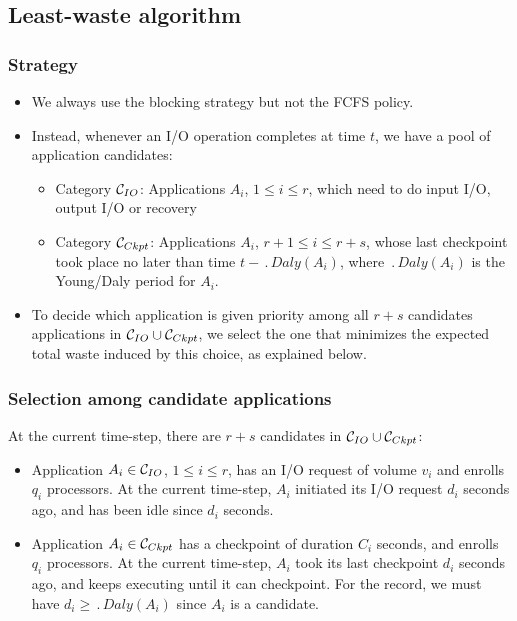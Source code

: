 \subsection{Least-waste algorithm}


\subsubsection{Strategy}

\begin{itemize}
  \item We always use the blocking strategy but not the FCFS policy.
  \item Instead, whenever an I/O operation completes at time $t$, we have a pool of application candidates:
  \begin{itemize}
   \item Category \IOcat $\mathcal{C}_{IO}$: Applications $A_{i}$, $1\leq i \leq r$, which need to do input I/O, output I/O or recovery
  \item Category \Ckptcat $\mathcal{C}_{Ckpt}$: Applications $A_{i}$, $r+1\leq i \leq r+s$,
  whose last checkpoint took place no later than time $t - \period{Daly}(A_{i})$, where $\period{Daly}(A_{i})$ is the Young/Daly period for $A_{i}$.
  \end{itemize}
  \item To decide which application is given priority among all $r+s$ candidates applications in $\mathcal{C}_{IO} \cup \mathcal{C}_{Ckpt}$, we select the one that minimizes the expected total waste induced by this choice, as explained below.
  \end{itemize}

 \subsubsection{Selection among candidate applications}

At the current time-step, there are $r+s$ candidates in $\mathcal{C}_{IO} \cup \mathcal{C}_{Ckpt}$:
\begin{itemize}
  \item Application $A_{i} \in \mathcal{C}_{IO}$, $1\leq i \leq r$,
  has an I/O request of volume $v_{i}$ and enrolls $q_{i}$ processors. At the current time-step, $A_{i}$ initiated its I/O request $d_{i}$ seconds ago, and has been idle since $d_{i}$ seconds.
 \item Application $A_{i} \in  \mathcal{C}_{Ckpt}$ has a checkpoint of duration $C_{i}$ seconds,
  and enrolls $q_{i}$ processors. At the current time-step, $A_{i}$ took its last checkpoint
  $d_{i}$ seconds ago, and keeps executing until it can checkpoint. For the record, we must have $d_{i} \geq \period{Daly}(A_{i})$
  since $A_{i}$ is a candidate.
  \end{itemize}

